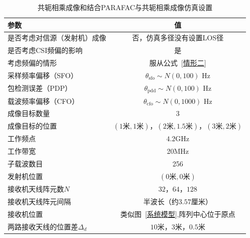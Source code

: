 \begin{table}[htb]
      \begin{center}
          \caption{共轭相乘成像和结合PARAFAC与共轭相乘成像仿真设置}\label{共轭相乘成像和结合PARAFAC与共轭相乘成像}
          \begin{tabular}{lc} %
              \toprule
              参数 & 值 \\
              \midrule
              是否考虑对信源（发射机）成像 & 否，仿真多径没有设置LOS径\\
              是否考虑CSI频偏的影响 & 是\\
              考虑频偏的情形  & 服从公式~\eqref{情形二}\\
              采样频率偏移（SFO）   &   $\theta_{\text{sfo}}\sim N(0,100)$ Hz\\
              包检测误差（PDP）     &   $\theta_{\text{pdd}}\sim N(0,100)$ Hz\\
              载波频率偏移（CFO）   &   $\theta_{\text{cfo}}\sim N(0,1000)$ Hz\\
              成像目标数量    & 3\\
              成像目标的位置  & $(1\text{米},1\text{米})$，$(2\text{米},1.5\text{米})$，$(3\text{米},2\text{米})$ \\
              工作频点        & $4.2$GHz\\
              工作带宽      & 20MHz \\
              子载波数目      & 256\\
              发射机位置           & $(0\text{米},0\text{米})$\\
              接收机天线阵元数$N$      & $32$，$64$，$128$\\
              接收机天线阵元间隔    & 半波长（约$3.57$厘米）\\
              接收机位置           & 类似图~\ref{系统模型},阵列中心位于原点\\
              两路接收天线的位置差$\Delta_d$ & $10$米，$3$米，$0.5$米\\
              \bottomrule
          \end{tabular}
      \end{center}
\end{table}
